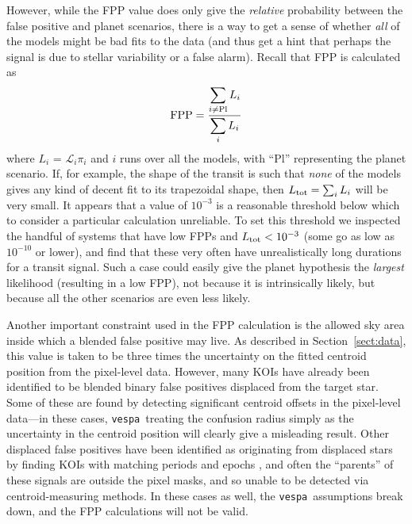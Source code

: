 \documentclass{emulateapj}
\newcommand{\eqlabel}[1]{\label{eq:#1}}
\newcommand{\sectionname}{Section}
\newcommand{\Sect}[1]{\sectionname~\ref{sect:#1}}
\newcommand{\sect}[1]{\Sect{#1}}
\newcommand{\vespa}{\texttt{vespa}}
\begin{document}
However, while the FPP value does only give the \emph{relative}
probability between the false positive and planet scenarios, there is
a way to get a sense of whether \emph{all} of the models might be bad
fits to the data (and thus get a hint that perhaps the signal is due
to stellar variability or a false alarm).  Recall that FPP is
calculated as
\begin{equation}
\eqlabel{fpp}
{\rm FPP} = \frac{\displaystyle\sum_{i \neq {\rm Pl}}
  L_i}{\displaystyle \sum_i L_i}
\end{equation}
where $L_i$ = $\mathcal L_i \pi_i$ and $i$ runs over all the models,
with ``Pl'' representing the planet scenario.  If, for example, the
shape of the transit is such that \emph{none} of the models gives any
kind of decent fit to its trapezoidal shape, then $L_{\rm tot} =
\sum_i L_i$ will be very small.  It appears that a value of $10^{-3}$
is a reasonable threshold below which to consider a particular
calculation unreliable.  To set this threshold we inspected the
handful of systems that have low FPPs and $L_{\rm tot} < 10^{-3}$
(some go as low as $10^{-10}$ or lower), and find that these very
often have unrealistically long durations for a transit signal.  Such
a case could easily give the planet hypothesis the \emph{largest}
likelihood (resulting in a low FPP), not because it is intrinsically
likely, but because all the other scenarios are even less likely.

Another important constraint used in the FPP calculation is the
allowed sky area inside which a blended false positive may live.  As
described in \sect{data}, this value is taken to be three times the
uncertainty on the fitted centroid position from the pixel-level data.
However, many KOIs have already been identified to be blended binary
false positives displaced from the target star.  Some of these are
found by detecting significant centroid offsets in the pixel-level
data---in these cases, \vespa\ treating the confusion radius simply as
the uncertainty in the centroid position will clearly give a
misleading result.  Other displaced false positives have been
identified as originating from displaced stars by finding KOIs with
matching periods and epochs \citep{Coughlin:2014}, and often the
``parents'' of these signals are outside the pixel masks, and so
unable to be detected via centroid-measuring methods.  In these cases
as well, the \vespa\ assumptions break down, and the FPP calculations
will not be valid.
\end{document}
